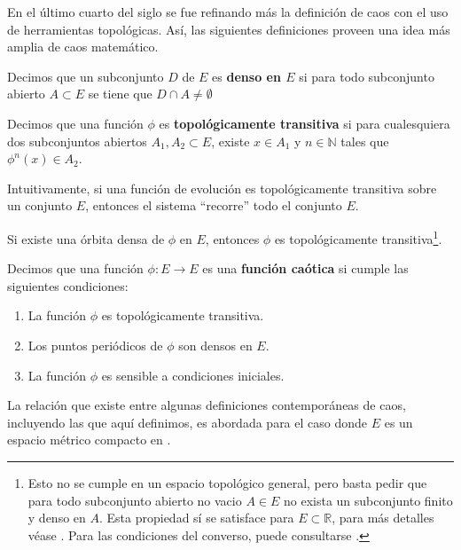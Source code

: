 \documentclass[../Main.tex]{subfiles}
\begin{document}
 En el último cuarto del siglo se fue refinando más la definición de caos con el uso de herramientas topológicas. Así, las siguientes definiciones proveen una idea más amplia de caos matemático.  
 \begin{definition}
     Decimos que un subconjunto $D$ de $E$ es \textbf{denso en $E$} si para todo subconjunto abierto $A\subset E$ se tiene que $D\cap A\neq \emptyset$
 \end{definition}
\begin{definition}
    Decimos que una función $\phi$ es \textbf{topológicamente transitiva} si para cualesquiera dos subconjuntos abiertos $A_1,A_2\subset E$, existe $x\in A_1$ y $n\in \mathbb{N}$ tales que $\phi^n(x)\in A_2$.
\end{definition}
\begin{remark}
Intuitivamente, si una función de evolución es topológicamente transitiva sobre un conjunto $E$, entonces el sistema ``recorre'' todo el conjunto $E$.
    \end{remark}
    \begin{remark}
    Si existe una órbita densa de $\phi$ en $E$, entonces $\phi$ es topológicamente transitiva\footnote{Esto no se cumple en un espacio topológico general, pero basta pedir que para todo subconjunto abierto no vacio $A\in E$ no exista un subconjunto finito y denso en $A$. Esta propiedad sí se satisface para $E\subset \mathbb{R}$, para más detalles véase \cite{Degirmenci2003}. Para las condiciones del converso, puede consultarse \cite{KingMendez2014}.}. 
\end{remark}
\begin{definition}
\label{def:caos}
    Decimos que una función $\phi:E\rightarrow E$ es una \textbf{función caótica}\cite{devaney2021} si cumple las siguientes condiciones:
    \begin{enumerate}
            \item La función $\phi$ es topológicamente transitiva.
        \item Los puntos periódicos de $\phi$ son densos en $E$.
        \item La función $\phi$ es sensible a condiciones iniciales. 
    \end{enumerate}
\end{definition}

La relación que existe entre algunas definiciones contemporáneas de caos, incluyendo las que aquí definimos, es abordada para el caso donde $E$ es un espacio métrico compacto en \cite{Aulbach2001}.
\end{document}
